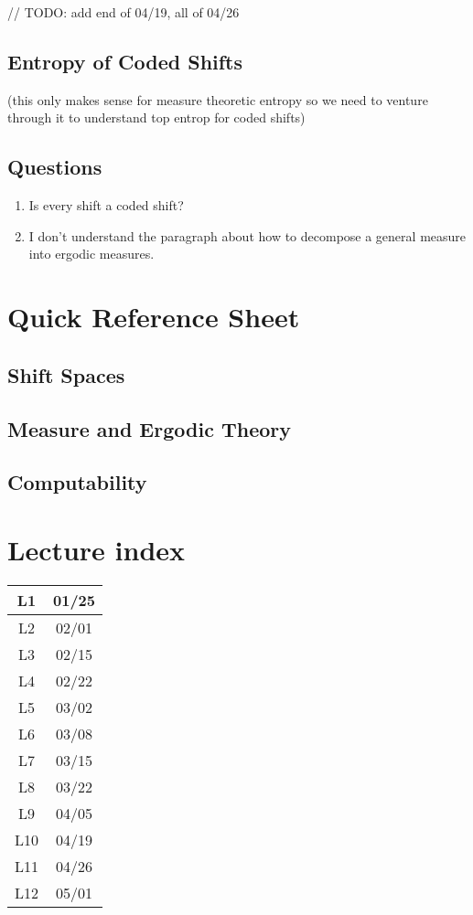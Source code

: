 \documentclass[11pt, reqno]{amsart}
\theoremstyle{plain}
\theoremstyle{definition}
\begin{document}
// TODO: add end of 04/19, all of 04/26

\subsection{Entropy of Coded Shifts}\cite[L12]{wolf}
(this only makes sense for measure theoretic entropy so we need to venture through it to understand top entrop for coded shifts)

\subsection{Questions}
\begin{enumerate}
  \item Is every shift a coded shift?
  \item I don't understand the paragraph about how to decompose a general measure into ergodic measures.
\end{enumerate}

\appendix
\section{Quick Reference Sheet}
\subsection{Shift Spaces}
\subsection{Measure and Ergodic Theory}
\subsection{Computability}

\section{Lecture index}  

\begin{tabular}{|c|c|}\hline
  L1 & 01/25 \\ \hline
  L2 & 02/01 \\ \hline
  L3 & 02/15 \\ \hline
  L4 & 02/22 \\ \hline
  L5 & 03/02 \\ \hline
  L6 & 03/08 \\ \hline
  L7 & 03/15 \\ \hline
  L8 & 03/22 \\ \hline
  L9 & 04/05 \\ \hline
  L10 & 04/19 \\ \hline
  L11 & 04/26 \\ \hline
  L12 & 05/01 \\ \hline
\end{tabular}

\printbibliography
\end{document}
